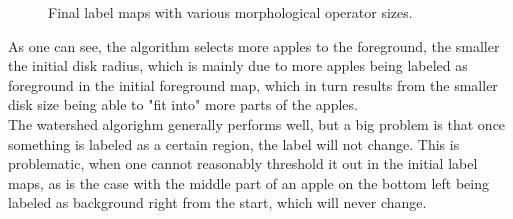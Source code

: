 \documentclass[11pt,a4paper]{article}
\begin{document}
\begin{figure}
\quad
{}
\quad

\caption{Final label maps with various morphological operator sizes.}%
\label{fig:e3}
\end{figure}

As one can see, the algorithm selects more apples to the foreground, the smaller the initial disk radius, which is mainly due to more apples being labeled as foreground in the initial foreground map, which in turn results from the smaller disk size being able to "fit into" more parts of the apples.\\
The watershed algorighm generally performs well, but a big problem is that once something is labeled as a certain region, the label will not change. This is problematic, when one cannot reasonably threshold it out in the initial label maps, as is the case with the middle part of an apple on the bottom left being labeled as background right from the start, which will never change.

\FloatBarrier
\end{document}
